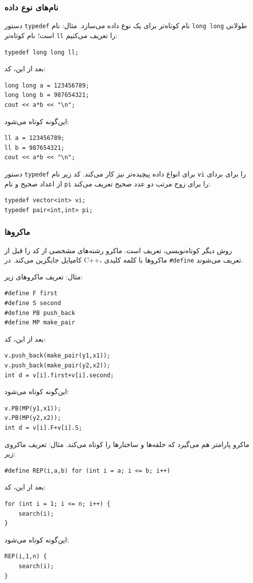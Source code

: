\subsubsection{نام‌های نوع داده}
دستور \texttt{typedef} نام کوتاه‌تر
برای یک نوع داده می‌سازد.
مثال: نام \texttt{long long} طولانی است؛
نام کوتاه‌تر \texttt{ll} را تعریف می‌کنیم:
\begin{lstlisting}
typedef long long ll;
\end{lstlisting}
بعد از این، کد:
\begin{lstlisting}
long long a = 123456789;
long long b = 987654321;
cout << a*b << "\n";
\end{lstlisting}
این‌گونه کوتاه می‌شود:
\begin{lstlisting}
ll a = 123456789;
ll b = 987654321;
cout << a*b << "\n";
\end{lstlisting}

دستور \texttt{typedef} برای انواع داده پیچیده‌تر نیز کار می‌کند.
کد زیر نام \texttt{vi} را برای بردای از اعداد صحیح
و نام \texttt{pi} را برای زوج مرتب دو عدد صحیح تعریف می‌کند:
\begin{lstlisting}
typedef vector<int> vi;
typedef pair<int,int> pi;
\end{lstlisting}

\subsubsection{ماکروها}
روش دیگر کوتاه‌نویسی، تعریف  است.
ماکرو رشته‌های مشخصی از کد را
قبل از کامپایل جایگزین می‌کند.
در C++، ماکروها با کلمه کلیدی \texttt{\#define} تعریف می‌شوند.

مثال: تعریف ماکروهای زیر:
\begin{lstlisting}
#define F first
#define S second
#define PB push_back
#define MP make_pair
\end{lstlisting}
بعد از این، کد:
\begin{lstlisting}
v.push_back(make_pair(y1,x1));
v.push_back(make_pair(y2,x2));
int d = v[i].first+v[i].second;
\end{lstlisting}
این‌گونه کوتاه می‌شود:
\begin{lstlisting}
v.PB(MP(y1,x1));
v.PB(MP(y2,x2));
int d = v[i].F+v[i].S;
\end{lstlisting}

ماکرو پارامتر هم می‌گیرد
که حلقه‌ها و ساختارها را کوتاه می‌کند.
مثال: تعریف ماکروی زیر:
\begin{lstlisting}
#define REP(i,a,b) for (int i = a; i <= b; i++)
\end{lstlisting}
بعد از این، کد:
\begin{lstlisting}
for (int i = 1; i <= n; i++) {
    search(i);
}
\end{lstlisting}
این‌گونه کوتاه می‌شود:
\begin{lstlisting}
REP(i,1,n) {
    search(i);
}
\end{lstlisting}

